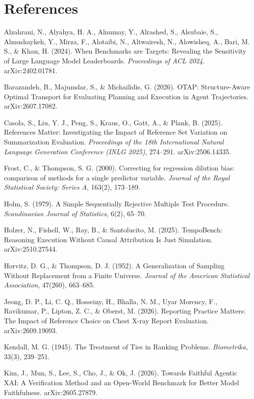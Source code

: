 \documentclass[11pt]{article}
\begin{document}
\section*{References}
\begin{enumerate}[label={[\arabic*]}]
\item Alzahrani, N., Alyahya, H. A., Alnumay, Y., Alrashed, S., Alsubaie, S., Almushaykeh, Y., Mirza, F., Alotaibi, N., Altwairesh, N., Alowisheq, A., Bari, M. S., \& Khan, H. (2024). When Benchmarks are Targets: Revealing the Sensitivity of Large Language Model Leaderboards. \emph{Proceedings of ACL 2024}. arXiv:2402.01781.
\item Barazandeh, B., Majumdar, S., \& Michailidis, G. (2026). OTAP: Structure-Aware Optimal Transport for Evaluating Planning and Execution in Agent Trajectories. arXiv:2607.17082.
\item Casola, S., Liu, Y. J., Peng, S., Kraus, O., Gatt, A., \& Plank, B. (2025). References Matter: Investigating the Impact of Reference Set Variation on Summarization Evaluation. \emph{Proceedings of the 18th International Natural Language Generation Conference (INLG 2025)}, 274--291. arXiv:2506.14335.
\item Frost, C., \& Thompson, S. G. (2000). Correcting for regression dilution bias: comparison of methods for a single predictor variable. \emph{Journal of the Royal Statistical Society: Series A}, 163(2), 173--189.
\item Holm, S. (1979). A Simple Sequentially Rejective Multiple Test Procedure. \emph{Scandinavian Journal of Statistics}, 6(2), 65--70.
\item Holzer, N., Fishell, W., Ray, B., \& Santolucito, M. (2025). TempoBench: Reasoning Execution Without Causal Attribution Is Just Simulation. arXiv:2510.27544.
\item Horvitz, D. G., \& Thompson, D. J. (1952). A Generalization of Sampling Without Replacement from a Finite Universe. \emph{Journal of the American Statistical Association}, 47(260), 663--685.
\item Jeong, D. P., Li, C. Q., Hosseiny, H., Bhalla, N. M., Uyar Morency, F., Ravikumar, P., Lipton, Z. C., \& Oberst, M. (2026). Reporting Practice Matters: The Impact of Reference Choice on Chest X-ray Report Evaluation. arXiv:2609.19093.
\item Kendall, M. G. (1945). The Treatment of Ties in Ranking Problems. \emph{Biometrika}, 33(3), 239--251.
\item Kim, J., Mun, S., Lee, S., Cho, J., \& Ok, J. (2026). Towards Faithful Agentic XAI: A Verification Method and an Open-World Benchmark for Better Model Faithfulness. arXiv:2605.27879.

\end{enumerate}
\end{document}

